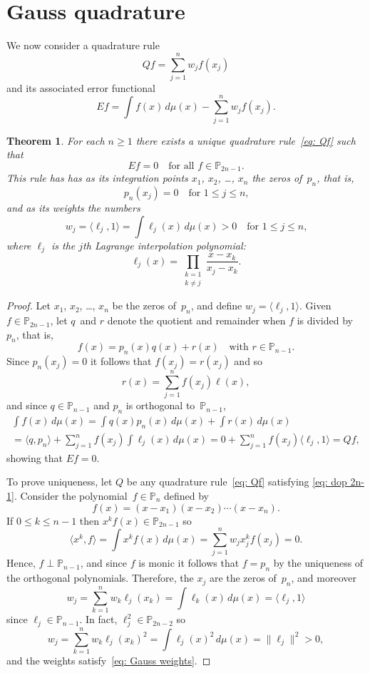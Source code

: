 \documentclass[12pt,a4paper]{article}
\newtheorem{theorem}{Theorem}
\newcommand{\iprod}[1]{\langle#1\rangle}
\newcommand{\Poly}{\mathbb{P}}
\begin{document}
\section{Gauss quadrature}
We now consider a quadrature rule
\begin{equation}\label{eq: Qf}
Qf=\sum_{j=1}^n w_jf(x_j)
\end{equation}
and its associated error functional
\[
Ef=\int f(x)\,d\mu(x)-\sum_{j=1}^n w_jf(x_j).
\]

\begin{theorem}\label{thm: Gauss rule}
For each $n\ge1$ there exists a unique quadrature rule~\eqref{eq: Qf}
such that
\begin{equation}\label{eq: dop 2n-1}
Ef=0\quad\text{for all $f\in\Poly_{2n-1}$.}
\end{equation}
This rule has has as its integration points $x_1$, $x_2$, \dots, 
$x_n$ the zeros of~$p_n$, that is,
\[
p_n(x_j)=0\quad\text{for $1\le j\le n$,}
\]
and as its weights the numbers
\begin{equation}\label{eq: Gauss weights}
w_j=\iprod{\ell_j,1}=\int\ell_j(x)\,d\mu(x)>0
	\quad\text{for $1\le j\le n$,}
\end{equation}
where $\ell_j$ is the $j$th Lagrange interpolation polynomial:
\[
\ell_j(x)=\prod_{\substack{k=1\\ k\ne j}}\frac{x-x_k}{x_j-x_k}.
\]
\end{theorem}
\begin{proof}
Let $x_1$, $x_2$, \dots, $x_n$ be the zeros of~$p_n$, and define
$w_j=\iprod{\ell_j,1}$.  Given $f\in\Poly_{2n-1}$, let $q$~and $r$ 
denote the quotient and remainder when $f$ is divided by~$p_n$, that 
is,
\[
f(x)=p_n(x)q(x)+r(x)\quad\text{with $r\in\Poly_{n-1}$.}
\]
Since $p_n(x_j)=0$ it follows that $f(x_j)=r(x_j)$ and so
\[
r(x)=\sum_{j=1}^n f(x_j)\ell(x),
\]
and since $q\in\Poly_{n-1}$ and $p_n$ is orthogonal to~$\Poly_{n-1}$,
\begin{multline*}
\int f(x)\,d\mu(x)=\int q(x)p_n(x)\,d\mu(x)+\int r(x)\,d\mu(x)\\
	=\iprod{q,p_n}+\sum_{j=1}^n f(x_j)\int\ell_j(x)\,d\mu(x)
	=0+\sum_{j=1}^n f(x_j)\iprod{\ell_j,1}=Qf,
\end{multline*}
showing that $Ef=0$.  

To prove uniqueness, let $Q$ be any quadrature rule~\eqref{eq: Qf} 
satisfying \eqref{eq: dop 2n-1}.  Consider the 
polynomial~$f\in\Poly_n$ defined by
\[
f(x)=(x-x_1)(x-x_2)\cdots(x-x_n).
\]
If $0\le k\le n-1$ then $x^kf(x)\in\Poly_{2n-1}$ so
\[
\iprod{x^k,f}=\int x^kf(x)\,d\mu(x)=\sum_{j=1}^n w_jx_j^kf(x_j)=0.
\]
Hence, $f\perp\Poly_{n-1}$, and since $f$ is monic it follows that 
$f=p_n$ by the uniqueness of the orthogonal polynomials.  Therefore,
the $x_j$ are the zeros of~$p_n$, and moreover
\[
w_j=\sum_{k=1}^nw_k\ell_j(x_k)=\int\ell_k(x)\,d\mu(x)=\iprod{\ell_j,1}
\]
since $\ell_j\in\Poly_{n-1}$.  In fact, $\ell_j^2\in\Poly_{2n-2}$ so
\[
w_j=\sum_{k=1}^nw_k\ell_j(x_k)^2=\int\ell_j(x)^2\,d\mu(x)
	=\|\ell_j\|^2>0,
\]
and the weights satisfy~\eqref{eq: Gauss weights}.
\end{proof}
\end{document}
